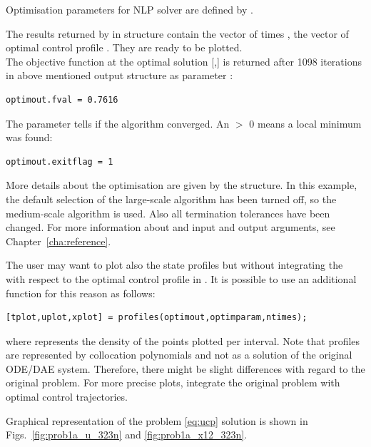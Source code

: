 Optimisation parameters for NLP solver are defined by
. 


The results returned by  in  structure
contain the vector of times , the vector of optimal control
profile . They are ready to be plotted.\\
The objective function at the optimal solution [,]
is returned after 1098 iterations in above mentioned output structure
 as parameter :
\begin{verbatim}
optimout.fval = 0.7616
\end{verbatim}
The parameter  tells if the algorithm converged. An
 $>$ 0 means a local minimum was found: 
\begin{verbatim}
optimout.exitflag = 1
\end{verbatim}
More details about the optimisation are given by the
 structure. In this example, the default
selection of the large-scale algorithm has been turned off, so the
medium-scale algorithm is used. Also all termination tolerances have
been changed. For more information about  and
 input and output arguments, see Chapter~\ref{cha:reference}. 

The user may want to plot also the state profiles but without
integrating the  with respect to the optimal control
profile in . It is possible to use an additional
function  for this reason as follows:
\begin{verbatim}
[tplot,uplot,xplot] = profiles(optimout,optimparam,ntimes);
\end{verbatim}
where  represents the density of the points plotted per
interval. Note that profiles are represented by collocation
polynomials and not as a solution of the original ODE/DAE
system. Therefore, there might be slight differences with regard to
the original problem. For more precise plots, integrate the original
problem with optimal control trajectories.

Graphical representation of the problem \eqref{eq:ucp} solution is
shown in Figs.~\ref{fig:prob1a_u_323n} and \ref{fig:prob1a_x12_323n}. 

